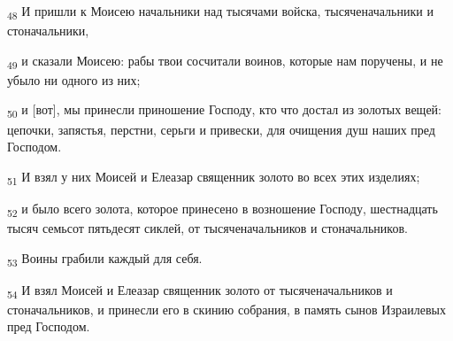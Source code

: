 \begin{tcolorbox}
\textsubscript{48} И пришли к Моисею начальники над тысячами войска, тысяченачальники и стоначальники,
\end{tcolorbox}
\begin{tcolorbox}
\textsubscript{49} и сказали Моисею: рабы твои сосчитали воинов, которые нам поручены, и не убыло ни одного из них;
\end{tcolorbox}
\begin{tcolorbox}
\textsubscript{50} и [вот], мы принесли приношение Господу, кто что достал из золотых вещей: цепочки, запястья, перстни, серьги и привески, для очищения душ наших пред Господом.
\end{tcolorbox}
\begin{tcolorbox}
\textsubscript{51} И взял у них Моисей и Елеазар священник золото во всех этих изделиях;
\end{tcolorbox}
\begin{tcolorbox}
\textsubscript{52} и было всего золота, которое принесено в возношение Господу, шестнадцать тысяч семьсот пятьдесят сиклей, от тысяченачальников и стоначальников.
\end{tcolorbox}
\begin{tcolorbox}
\textsubscript{53} Воины грабили каждый для себя.
\end{tcolorbox}
\begin{tcolorbox}
\textsubscript{54} И взял Моисей и Елеазар священник золото от тысяченачальников и стоначальников, и принесли его в скинию собрания, в память сынов Израилевых пред Господом.
\end{tcolorbox}

